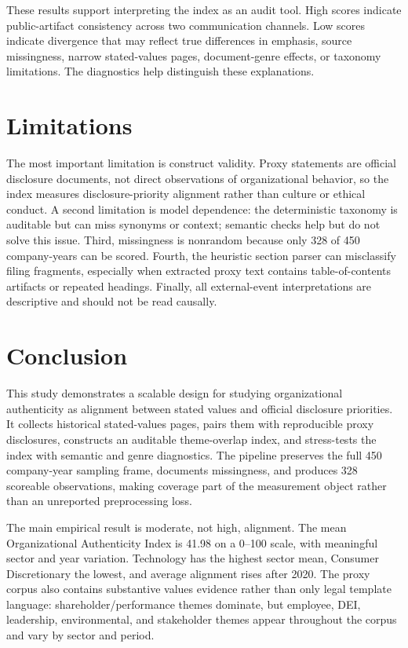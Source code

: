\documentclass[11pt]{article}
\begin{document}
These results support interpreting the index as an audit tool. High scores indicate public-artifact
consistency across two communication channels. Low scores indicate divergence that may reflect true
differences in emphasis, source missingness, narrow stated-values pages, document-genre effects, or
taxonomy limitations. The diagnostics help distinguish these explanations.

\section{Limitations}

The most important limitation is construct validity. Proxy statements are official disclosure
documents, not direct observations of organizational behavior, so the index measures
disclosure-priority alignment rather than culture or ethical conduct. A second limitation is model
dependence: the deterministic taxonomy is auditable but can miss synonyms or context; semantic
checks help but do not solve this issue. Third, missingness is nonrandom because only 328 of 450
company-years can be scored. Fourth, the heuristic section parser can misclassify filing fragments,
especially when extracted proxy text contains table-of-contents artifacts or repeated headings.
Finally, all external-event interpretations are descriptive and should not be read causally.

\section{Conclusion}

This study demonstrates a scalable design for studying organizational authenticity as alignment
between stated values and official disclosure priorities. It collects historical stated-values
pages, pairs them with reproducible proxy disclosures, constructs an auditable theme-overlap index,
and stress-tests the index with semantic and genre diagnostics. The pipeline preserves the full
450 company-year sampling frame, documents missingness, and produces 328 scoreable observations,
making coverage part of the measurement object rather than an unreported preprocessing loss.

The main empirical result is moderate, not high, alignment. The mean Organizational Authenticity
Index is 41.98 on a 0--100 scale, with meaningful sector and year variation. Technology has the
highest sector mean, Consumer Discretionary the lowest, and average alignment rises after 2020. The
proxy corpus also contains substantive values evidence rather than only legal template language:
shareholder/performance themes dominate, but employee, DEI, leadership, environmental, and
stakeholder themes appear throughout the corpus and vary by sector and period.
\end{document}
